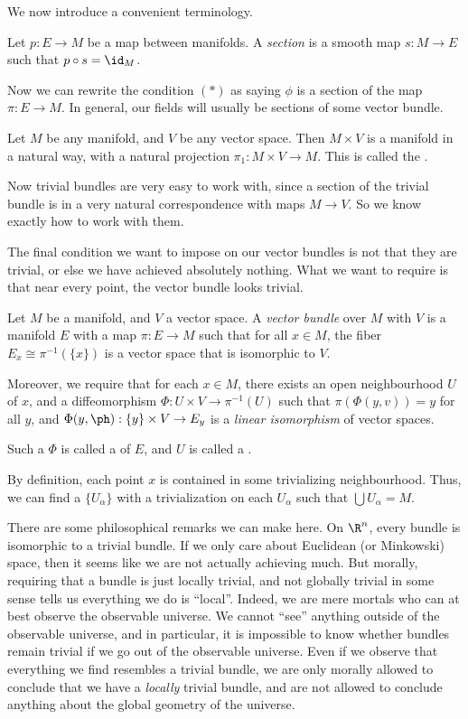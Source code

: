 \documentclass[a4paper]{article}
\begin{document}
We now introduce a convenient terminology.
\begin{defi}[Section]
  Let $p: E \to M$ be a map between manifolds. A \emph{section} is a smooth map $s: M \to E$ such that $p \circ s = \id_M$.
\end{defi}
Now we can rewrite the condition $(*)$ as saying $\phi$ is a section of the map $\pi: E \to M$. In general, our fields will usually be sections of some vector bundle.

\begin{eg}
  Let $M$ be any manifold, and $V$ be any vector space. Then $M \times V$ is a manifold in a natural way, with a natural projection $\pi_1: M \times V \to M$. This is called the .
\end{eg}

Now trivial bundles are very easy to work with, since a section of the trivial bundle is in a very natural correspondence with maps $M \to V$. So we know exactly how to work with them.

The final condition we want to impose on our vector bundles is not that they are trivial, or else we have achieved absolutely nothing. What we want to require is that near every point, the vector bundle looks trivial.

\begin{defi}
  Let $M$ be a manifold, and $V$ a vector space. A \emph{vector bundle} over $M$ with  $V$ is a manifold $E$ with a map $\pi: E \to M$ such that for all $x \in M$, the fiber $E_x \cong \pi^{-1}(\{x\})$ is a vector space that is isomorphic to $V$.

  Moreover, we require that for each $x \in M$, there exists an open neighbourhood $U$ of $x$, and a diffeomorphism $\Phi: U \times V \to \pi^{-1}(U)$ such that $\pi(\Phi(y, v)) = y$ for all $y$, and $\Phi(y, \ph): \{y\} \times V \to E_y$ is a \emph{linear isomorphism} of vector spaces.

  Such a $\Phi$ is called a  of $E$, and $U$ is called a .
\end{defi}
By definition, each point $x$ is contained in some trivializing neighbourhood. Thus, we can find a  $\{U_\alpha\}$ with a trivialization on each $U_\alpha$ such that $\bigcup U_\alpha = M$.

There are some philosophical remarks we can make here. On $\R^n$, every bundle is isomorphic to a trivial bundle. If we only care about Euclidean (or Minkowski) space, then it seems like we are not actually achieving much. But morally, requiring that a bundle is just locally trivial, and not globally trivial in some sense tells us everything we do is ``local''. Indeed, we are mere mortals who can at best observe the observable universe. We cannot ``see'' anything outside of the observable universe, and in particular, it is impossible to know whether bundles remain trivial if we go out of the observable universe. Even if we observe that everything we find resembles a trivial bundle, we are only morally allowed to conclude that we have a \emph{locally} trivial bundle, and are not allowed to conclude anything about the global geometry of the universe.
\end{document}
